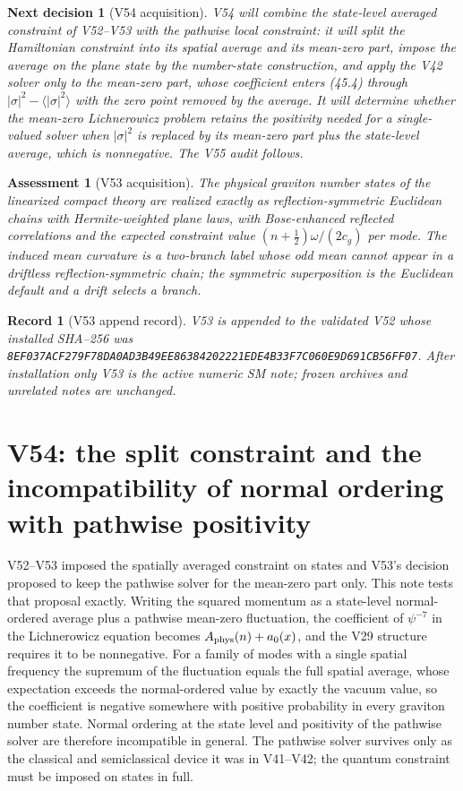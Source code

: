 \documentclass[11pt]{article}
\newtheorem{decision}[theorem]{Next decision}
\newtheorem{assessment}[theorem]{Assessment}
\newtheorem{record}[theorem]{Record}
\theoremstyle{remark}
\begin{document}
\begin{decision}[V54 acquisition]
\label{dec:v19v53-next}
V54 will combine the state-level averaged constraint of V52--V53 with
the pathwise local constraint: it will split the Hamiltonian constraint
into its spatial average and its mean-zero part, impose the average on
the plane state by the number-state construction, and apply the V42
solver only to the mean-zero part, whose coefficient enters (45.4)
through \(|\sigma|^2-\langle|\sigma|^2\rangle\) with the zero point
removed by the average.  It will determine whether the mean-zero
Lichnerowicz problem retains the positivity needed for a single-valued
solver when \(|\sigma|^2\) is replaced by its mean-zero part plus the
state-level average, which is nonnegative.  The V55 audit follows.
\end{decision}

\begin{assessment}[V53 acquisition]
\label{ass:v19v53}
The physical graviton number states of the linearized compact theory
are realized exactly as reflection-symmetric Euclidean chains with
Hermite-weighted plane laws, with Bose-enhanced reflected correlations
and the expected constraint value \((n+\tfrac12)\omega/(2c_g)\) per
mode.  The induced mean curvature is a two-branch label whose odd mean
cannot appear in a driftless reflection-symmetric chain; the symmetric
superposition is the Euclidean default and a drift selects a branch.
\end{assessment}

\begin{record}[V53 append record]
\label{rec:v19v53}
V53 is appended to the validated V52 whose installed SHA--256 was
\texttt{8EF037ACF279F78DA0AD3B49EE86384202221EDE4B33F7C060E9D691CB56FF07}.
After installation only V53 is the active numeric SM note; frozen
archives and unrelated notes are unchanged.
\end{record}


\section{V54: the split constraint and the incompatibility of normal ordering with pathwise positivity}
\label{sec:v19v54}

V52--V53 imposed the spatially averaged constraint on states and V53's
decision proposed to keep the pathwise solver for the mean-zero part
only.  This note tests that proposal exactly.  Writing the squared
momentum as a state-level normal-ordered average plus a pathwise
mean-zero fluctuation, the coefficient of \(\psi^{-7}\) in the
Lichnerowicz equation becomes \(A_{\rm phys}(n)+a_0(x)\), and the V29
structure requires it to be nonnegative.  For a family of modes with a
single spatial frequency the supremum of the fluctuation equals the
full spatial average, whose expectation exceeds the normal-ordered
value by exactly the vacuum value, so the coefficient is negative
somewhere with positive probability in every graviton number state.
Normal ordering at the state level and positivity of the pathwise
solver are therefore incompatible in general.  The pathwise solver
survives only as the classical and semiclassical device it was in
V41--V42; the quantum constraint must be imposed on states in full.
\end{document}
